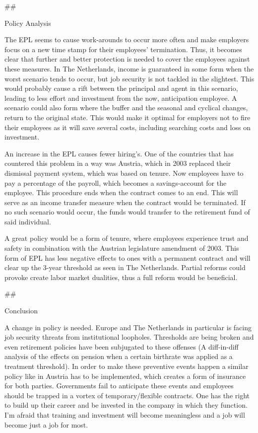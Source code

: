 \documentclass[11pt]{article}
\begin{document}
    \#\#

{Policy Analysis}

The EPL seems to cause work-arounds to occur more often and make
employers focus on a new time stamp for their employees' termination.
Thus, it becomes clear that further and better protection is needed to
cover the employees against these measures. In The Netherlands, income
is guaranteed in some form when the worst scenario tends to occur, but
job security is not tackled in the slightest. This would probably cause
a rift between the principal and agent in this scenario, leading to less
effort and investment from the now, anticipation employee. A scenario
could also form where the buffer and the seasonal and cyclical changes,
return to the original state. This would make it optimal for employers
not to fire their employees as it will save several costs, including
searching costs and loss on investment.

An increase in the EPL causes fewer hiring's. One of the countries that
has countered this problem in a way was Austria, which in 2003 replaced
their dismissal payment system, which was based on tenure. Now employees
have to pay a percentage of the payroll, which becomes a savings-account
for the employee. This procedure ends when the contract comes to an end.
This will serve as an income transfer measure when the contract would be
terminated. If no such scenario would occur, the funds would transfer to
the retirement fund of said individual.

A great policy would be a form of tenure, where employees experience
trust and safety in combination with the Austrian legislature amendment
of 2003. This form of EPL has less negative effects to ones with a
permanent contract and will clear up the 3-year threshold as seen in The
Netherlands. Partial reforms could provoke create labor market
dualities, thus a full reform would be beneficial.

    \#\#

{Conclusion}

A change in policy is needed. Europe and The Netherlands in particular
is facing job security threats from institutional loopholes. Thresholds
are being broken and even retirement policies have been subjugated to
these offenses (A diff-in-diff analysis of the effects on pension when a
certain birthrate was applied as a treatment threshold). In order to
make these preventive events happen a similar policy like in Austria has
to be implemented, which creates a form of insurance for both parties.
Governments fail to anticipate these events and employees should be
trapped in a vortex of temporary/flexible contracts. One has the right
to build up their career and be invested in the company in which they
function. I'm afraid that training and investment will become
meaningless and a job will become just a job for most.
\end{document}
